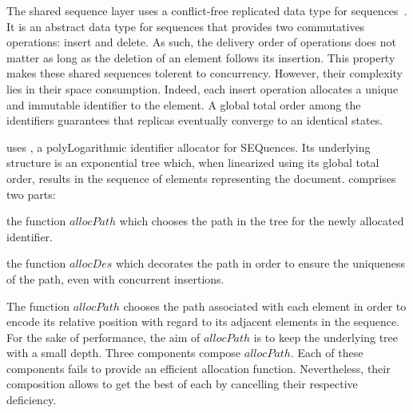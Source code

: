 \begin{asparadesc}
\item [The shared sequence layer] uses a conflict-free replicated data type for
  sequences~\cite{shapiro2011comprehensive, shapiro2011conflict}. It is an
  abstract data type for sequences that provides two commutatives operations:
  insert and delete. As such, the delivery order of operations does not matter
  as long as the deletion of an element follows its insertion. This property
  makes these shared sequences tolerent to concurrency. However, their
  complexity lies in their space consumption. Indeed, each insert operation
  allocates a unique and immutable identifier to the element. A global total
  order among the identifiers guarantees that replicas eventually converge to an
  identical states.

  \CRATE uses \LSEQ, a polyLogarithmic identifier allocator for SEQuences. Its
  underlying structure is an exponential tree which, when linearized using its
  global total order, results in the sequence of elements representing the
  document. \LSEQ comprises two parts:
  \begin{inparaenum}[(i)]
  \item the function $allocPath$ which chooses the path in the tree for the
    newly allocated identifier.
  \item the function $allocDes$ which decorates the path in order to ensure the
    uniqueness of the path, even with concurrent insertions.
  \end{inparaenum}

  The function $allocPath$ chooses the path associated with each element in
  order to encode its relative position with regard to its adjacent elements in
  the sequence. For the sake of performance, the aim of $allocPath$ is to keep
  the underlying tree with a small depth. Three components compose
  $allocPath$. Each of these components fails to provide an efficient allocation
  function. Nevertheless, their composition allows to get the best of each by
  cancelling their respective deficiency.
\end{asparadesc}

